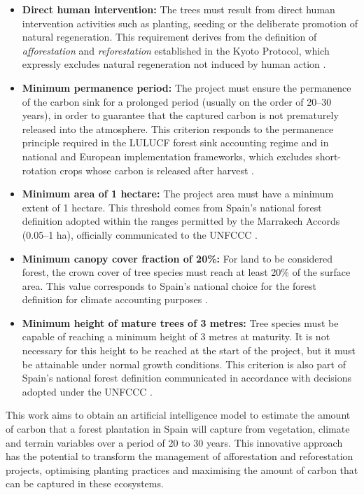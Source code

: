 \begin{itemize}
\item \textbf{Direct human intervention:}
The trees must result from direct human intervention activities such as planting, seeding or the deliberate promotion of natural regeneration. This requirement derives from the definition of \emph{afforestation} and \emph{reforestation} established in the Kyoto Protocol, which expressly excludes natural regeneration not induced by human action \cite{UNFCCCMarrakech}.

\item \textbf{Minimum permanence period:}
The project must ensure the permanence of the carbon sink for a prolonged period (usually on the order of 20--30 years), in order to guarantee that the captured carbon is not prematurely released into the atmosphere. This criterion responds to the permanence principle required in the LULUCF forest sink accounting regime and in national and European implementation frameworks, which excludes short-rotation crops whose carbon is released after harvest \cite{UNFCCCMarrakech,EULULUCF2018}.

\item \textbf{Minimum area of 1 hectare:}
The project area must have a minimum extent of 1 hectare. This threshold comes from Spain's national forest definition adopted within the ranges permitted by the Marrakech Accords (0.05--1 ha), officially communicated to the UNFCCC \cite{UNFCCCSpainReview}.

\item \textbf{Minimum canopy cover fraction of 20\%:}
For land to be considered forest, the crown cover of tree species must reach at least 20\% of the surface area. This value corresponds to Spain's national choice for the forest definition for climate accounting purposes \cite{UNFCCCSpainReview}.

\item \textbf{Minimum height of mature trees of 3 metres:}
Tree species must be capable of reaching a minimum height of 3 metres at maturity. It is not necessary for this height to be reached at the start of the project, but it must be attainable under normal growth conditions. This criterion is also part of Spain's national forest definition communicated in accordance with decisions adopted under the UNFCCC \cite{UNFCCCSpainReview}.
\end{itemize}

This work aims to obtain an artificial intelligence model to estimate the amount of carbon that a forest plantation in Spain will capture from vegetation, climate and terrain variables over a period of 20 to 30 years. This innovative approach has the potential to transform the management of afforestation and reforestation projects, optimising planting practices and maximising the amount of carbon that can be captured in these ecosystems.

